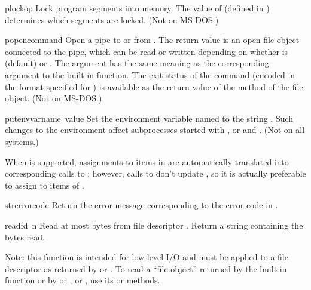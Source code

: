 \begin{funcdesc}{plock}{op}
Lock program segments into memory.  The value of 
(defined in ) determines which segments are locked.
(Not on MS-DOS.)
\end{funcdesc}

\begin{funcdesc}{popen}{command}
Open a pipe to or from .  The return value is an open
file object connected to the pipe, which can be read or written
depending on whether  is  (default) or .
The  argument has the same meaning as the corresponding
argument to the built-in  function.  The exit status of
the command (encoded in the format specified for ) is
available as the return value of the  method of the file
object.
(Not on MS-DOS.)
\end{funcdesc}

\begin{funcdesc}{putenv}{varname\, value}
Set the environment variable named  to the string .  
Such changes to the environment affect
subprocesses started with ,  or
 and .  (Not on all systems.)

When  is
supported, assignments to items in  are automatically
translated into corresponding calls to ; however,
calls to  don't update , so it is
actually preferable to assign to items of .  
\end{funcdesc}

\begin{funcdesc}{strerror}{code}
Return the error message corresponding to the error code in .
\end{funcdesc}

\begin{funcdesc}{read}{fd\, n}
Read at most  bytes from file descriptor .
Return a string containing the bytes read.

Note: this function is intended for low-level I/O and must be applied
to a file descriptor as returned by  or
.  To read a ``file object'' returned by the
built-in function  or by  or
, or , use its
 or  methods.
\end{funcdesc}

